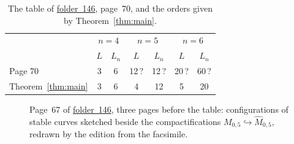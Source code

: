 \documentclass[11pt,a4paper]{amsart}
\theoremstyle{remark}
\newcommand{\fac}[1]{\href{https://grothendieck.umontpellier.fr/#1.pdf}{folder~#1}}
\begin{document}
\begin{table}[h]\centering
\caption{The table of \fac{146}, page~70, and the orders given by Theorem~\ref{thm:main}.}\label{tab:table}
\begin{tabular}{lcccccc}
\toprule
& \multicolumn{2}{c}{$n = 4$} & \multicolumn{2}{c}{$n = 5$} & \multicolumn{2}{c}{$n = 6$}\\
& $L$ & $L_n$ & $L$ & $L_n$ & $L$ & $L_n$\\
\midrule
Page 70 & 3 & 6 & 12\,? & 12\,? & 20\,? & 60\,?\\
Theorem~\ref{thm:main} & 3 & 6 & 4 & 12 & 5 & 20\\
\bottomrule
\end{tabular}
\end{table}
\begin{figure}[htbp]
\centering
\resizebox{0.7\linewidth}{!}{}
\caption{Page~67 of \fac{146}, three pages before the table: configurations of stable curves sketched beside the compactifications $M_{0,5} \hookrightarrow \hat M_{0,5}$, redrawn by the edition from the facsimile.}\label{fig:p67}
\end{figure}
\end{document}

